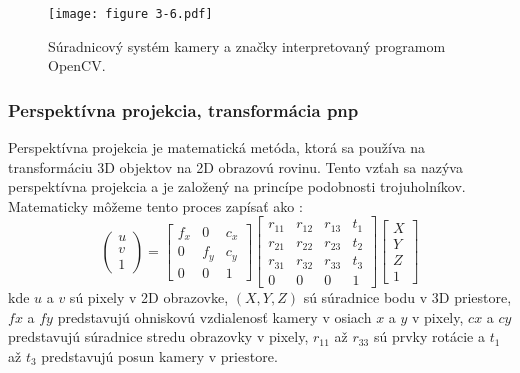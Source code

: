{\begin{figure}[ht!]
    \centering
    \texttt{[image: figure 3-6.pdf]}
    \caption{Súradnicový systém kamery a značky interpretovaný programom OpenCV.}
    \label{o:3-6}
\end{figure}  

\subsubsection{Perspektívna projekcia, transformácia pnp}
Perspektívna projekcia je matematická metóda, ktorá sa používa na transformáciu 3D objektov na 2D obrazovú rovinu. Tento vzťah sa nazýva perspektívna projekcia a je založený na princípe podobnosti trojuholníkov. Matematicky môžeme tento proces zapísať ako \citep{9549863}:
\begin{equation}
    \begin{pmatrix} u \\ v \\ 1 \end{pmatrix} =
    \begin{bmatrix}
        f_x & 0 & c_x \\
        0 & f_y & c_y \\
        0 & 0 & 1
    \end{bmatrix}
    \begin{bmatrix}
        r_{11} & r_{12} & r_{13} & t_1 \\
        r_{21} & r_{22} & r_{23} & t_2 \\
        r_{31} & r_{32} & r_{33} & t_3 \\
        0 & 0 & 0 & 1
    \end{bmatrix}
    \begin{bmatrix}
        X \\ 
        Y \\
        Z \\
        1
    \end{bmatrix}
\end{equation}
kde $u$ a $v$ sú pixely v 2D obrazovke, $(X, Y, Z)$ sú súradnice bodu v 3D priestore, $fx$ a $fy$ predstavujú ohniskovú vzdialenosť kamery v osiach $x$ a $y$ v pixely, $cx$ a $cy$ predstavujú súradnice stredu obrazovky v pixely, $r_{11}$ až $r_{33}$ sú prvky rotácie a $t_1$ až $t_3$ predstavujú posun kamery v priestore.

}
